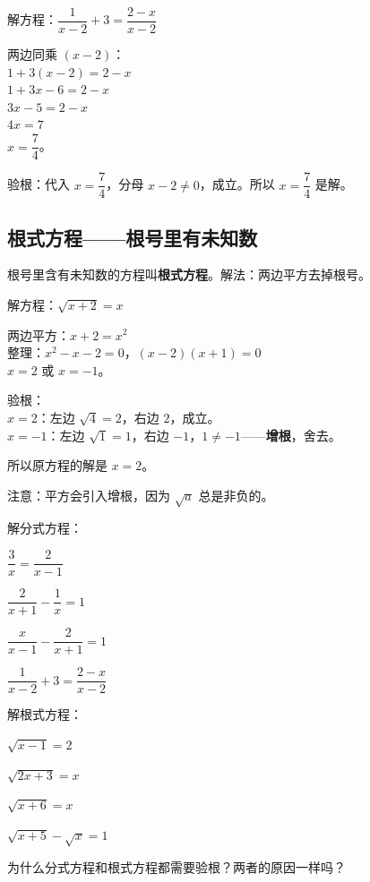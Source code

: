 \begin{example}
解方程：$\dfrac{1}{x-2} + 3 = \dfrac{2-x}{x-2}$
\end{example}
\begin{solution}
两边同乘 $(x-2)$：\\
$1 + 3(x-2) = 2-x$\\
$1 + 3x - 6 = 2 - x$\\
$3x - 5 = 2 - x$\\
$4x = 7$\\
$x = \dfrac{7}{4}$。

验根：代入 $x=\dfrac{7}{4}$，分母 $x-2\neq0$，成立。所以 $x=\dfrac{7}{4}$ 是解。
\end{solution}

\subsection*{根式方程——根号里有未知数}

根号里含有未知数的方程叫\textbf{根式方程}。解法：两边平方去掉根号。

\begin{example}
解方程：$\sqrt{x+2} = x$
\end{example}
\begin{solution}
两边平方：$x+2 = x^2$\\
整理：$x^2 - x - 2 = 0$，$(x-2)(x+1)=0$\\
$x=2$ 或 $x=-1$。

验根：\\
$x=2$：左边 $\sqrt{4}=2$，右边 $2$，成立。\\
$x=-1$：左边 $\sqrt{1}=1$，右边 $-1$，$1\neq-1$——\textbf{增根}，舍去。

所以原方程的解是 $x=2$。

注意：平方会引入增根，因为 $\sqrt{a}$ 总是非负的。
\end{solution}

\begin{exercise}
\item 解分式方程：
  \begin{subexercise}
    \item $\dfrac{3}{x} = \dfrac{2}{x-1}$
    \item $\dfrac{2}{x+1} - \dfrac{1}{x} = 1$
    \item $\dfrac{x}{x-1} - \dfrac{2}{x+1} = 1$
    \item $\dfrac{1}{x-2} + 3 = \dfrac{2-x}{x-2}$
  \end{subexercise}

\item 解根式方程：
  \begin{subexercise}
    \item $\sqrt{x-1} = 2$
    \item $\sqrt{2x+3} = x$
    \item $\sqrt{x+6} = x$
    \item $\sqrt{x+5} - \sqrt{x} = 1$
  \end{subexercise}

\item 为什么分式方程和根式方程都需要验根？两者的原因一样吗？
\end{exercise}

